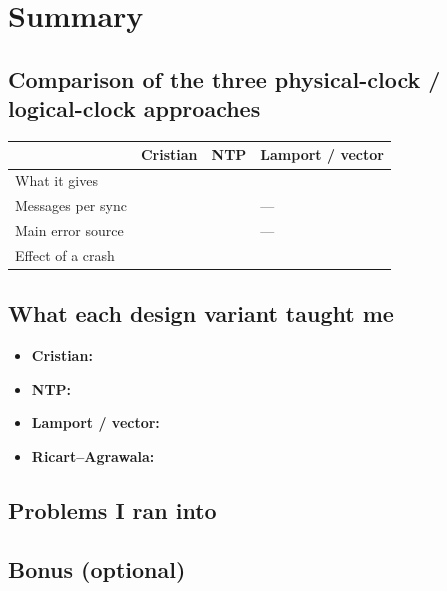 \section{Summary}

\subsection{Comparison of the three physical-clock / logical-clock approaches}
\begin{table}[H]\centering\small
\begin{tabularx}{\linewidth}{@{}lXXX@{}}
\toprule
 & Cristian & NTP & Lamport / vector \\ \midrule
What it gives       & \TODO{} & \TODO{} & \TODO{} \\
Messages per sync   & \TODO{} & \TODO{} & --- \\
Main error source   & \TODO{} & \TODO{} & --- \\
Effect of a crash   & \TODO{} & \TODO{} & \TODO{} \\
\bottomrule
\end{tabularx}
\end{table}

\subsection{What each design variant taught me}
\begin{itemize}[itemsep=2pt]
  \item \textbf{Cristian:} 
  \item \textbf{NTP:} 
  \item \textbf{Lamport / vector:} 
  \item \textbf{Ricart--Agrawala:} 
\end{itemize}

\subsection{Problems I ran into}

\subsection{Bonus (optional)}
